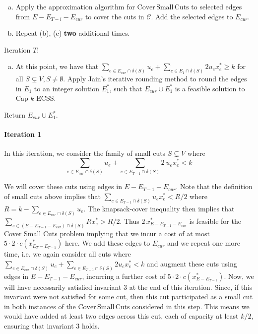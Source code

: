 \documentclass[11pt]{article}
\newcommand{\C}{\mathscr{C}}
\newcommand\ASC{\mathrm{Cover\,Small\,Cuts}}
\newcommand{\alphatwo}{2}
\begin{document}
{{\begin{algorithm}[H]
\begin{algorithmic}[1]
\begin{enumerate}[(a)]
        \item Apply the approximation algorithm for $\ASC$ to selected edges from $E - E_{T-i} - E_{cur}$ to cover the cuts in $\C$.  Add the selected edges to $E_{cur}$.

        \item Repeat (b), (c) \textbf{two} additional times.
    \end{enumerate}

    \State Iteration $T$:
    \begin{enumerate}[(a)]
        \item At this point, we have that $\sum_{e \in E_{cur} \cap \delta(S)}u_e + \sum_{e \in E_1 \cap \delta(S)}2 u_e x^*_e \geq k$ for all $S \subsetneq V, S \neq \emptyset$.  Apply Jain's iterative rounding method to round the edges in $E_1$ to an integer solution $E_1^*$, such that $E_{cur} \cup E_1^*$ is a feasible solution to Cap-$k$-ECSS.
    \end{enumerate}

    \State Return $E_{cur} \cup E_1^*$.
    \end{algorithmic}
\end{algorithm}
}



\paragraph{Iteration 1}

In this iteration, we consider the family of small cuts $S \subsetneq V$ where
\[
\sum_{e\in E_{cur} \cap \delta(S)}u_e+ \sum_{e\in E_{T-1} \cap \delta(S)}\alphatwo\  u_ex^*_e < k \tag{definition of small cuts}
\]

We will cover these cuts using edges in $E-E_{T-1} - E_{cur}$. Note
that the definition of small cuts above implies that $\sum_{e\in
E_{T-1} \cap \delta(S)}u_ex^*_e < R/\alphatwo$ where $R = k - \sum_{e\in E_{cur} \cap \delta(S)}u_e$.
The knapsack-cover inequality then implies that $\sum_{e\in (E-E_{T-1} - E_{cur}) \cap \delta(S)}
R x^*_e > R/\alphatwo$. Thus $\alphatwo\,x^*_{E-E_{T-1}
- E_{cur}}$ is feasible for the Cover Small Cuts problem implying
that we incur a cost of at most $5 \cdot \alphatwo \cdot c(x^*_{E_T-E_{T-1}})$
here. We add these edges to $E_{cur}$ and we repeat one more time,
i.e. we again consider all cuts where $\sum_{e\in E_{cur} \cap \delta(S)}u_e+
\sum_{e\in E_{T-1} \cap \delta(S)}\alphatwo u_ex^*_e < k$ and augment these cuts using
edges in $E-E_{T-1} - E_{cur}$, incurring a further cost of
$5 \cdot \alphatwo \cdot c(x^*_{E-E_{T-1}})$. Now, we will have necessarily satisfied
invariant 3 at the end of this iteration. Since, if this invariant were not satisfied for some cut, then this cut 
participated as a small cut in both instances of the $\ASC$ considered in this step.
This means we would have added at least two edges across this cut, each of capacity at least $k/2$, ensuring that invariant 3 holds.


}
\end{document}
